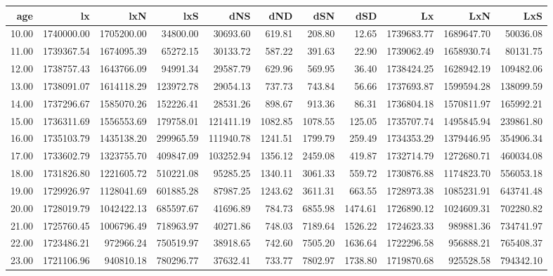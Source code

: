 \begin{table}[ht]
\centering
\begin{tabular}{rrrrrrrrrrr}
  \hline
age & lx & lxN & lxS & dNS & dND & dSN & dSD & Lx & LxN & LxS \\ 
  \hline
10.00 & 1740000.00 & 1705200.00 & 34800.00 & 30693.60 & 619.81 & 208.80 & 12.65 & 1739683.77 & 1689647.70 & 50036.08 \\ 
  11.00 & 1739367.54 & 1674095.39 & 65272.15 & 30133.72 & 587.22 & 391.63 & 22.90 & 1739062.49 & 1658930.74 & 80131.75 \\ 
  12.00 & 1738757.43 & 1643766.09 & 94991.34 & 29587.79 & 629.96 & 569.95 & 36.40 & 1738424.25 & 1628942.19 & 109482.06 \\ 
  13.00 & 1738091.07 & 1614118.29 & 123972.78 & 29054.13 & 737.73 & 743.84 & 56.66 & 1737693.87 & 1599594.28 & 138099.59 \\ 
  14.00 & 1737296.67 & 1585070.26 & 152226.41 & 28531.26 & 898.67 & 913.36 & 86.31 & 1736804.18 & 1570811.97 & 165992.21 \\ 
  15.00 & 1736311.69 & 1556553.69 & 179758.01 & 121411.19 & 1082.85 & 1078.55 & 125.05 & 1735707.74 & 1495845.94 & 239861.80 \\ 
  16.00 & 1735103.79 & 1435138.20 & 299965.59 & 111940.78 & 1241.51 & 1799.79 & 259.49 & 1734353.29 & 1379446.95 & 354906.34 \\ 
  17.00 & 1733602.79 & 1323755.70 & 409847.09 & 103252.94 & 1356.12 & 2459.08 & 419.87 & 1732714.79 & 1272680.71 & 460034.08 \\ 
  18.00 & 1731826.80 & 1221605.72 & 510221.08 & 95285.25 & 1340.11 & 3061.33 & 559.72 & 1730876.88 & 1174823.70 & 556053.18 \\ 
  19.00 & 1729926.97 & 1128041.69 & 601885.28 & 87987.25 & 1243.62 & 3611.31 & 663.55 & 1728973.38 & 1085231.91 & 643741.48 \\ 
  20.00 & 1728019.79 & 1042422.13 & 685597.67 & 41696.89 & 784.73 & 6855.98 & 1474.61 & 1726890.12 & 1024609.31 & 702280.82 \\ 
  21.00 & 1725760.45 & 1006796.49 & 718963.97 & 40271.86 & 748.03 & 7189.64 & 1526.22 & 1724623.33 & 989881.36 & 734741.97 \\ 
  22.00 & 1723486.21 & 972966.24 & 750519.97 & 38918.65 & 742.60 & 7505.20 & 1636.64 & 1722296.58 & 956888.21 & 765408.37 \\ 
  23.00 & 1721106.96 & 940810.18 & 780296.77 & 37632.41 & 733.77 & 7802.97 & 1738.80 & 1719870.68 & 925528.58 & 794342.10 \\ 

\end{tabular}
\end{table}
